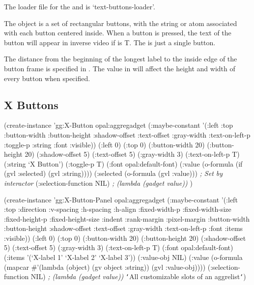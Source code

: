 \vspace{1 line}
The loader file for the  and
 is `text-buttons-loader'.

The  object is a set of rectangular buttons,
with the string or atom associated with each button centered inside.
When a button is pressed, the text of the button will appear in
inverse video if  is T.  The  is
just a single button.

The distance from the beginning of the longest label to the inside
edge of the button frame is specified in .  The value
in  will affect the height and width of every button
when specified.

\begin{group}
\subsection{X Buttons}
\label{x-buttons}
\begin{programexample}
(create-instance 'gg:X-Button opal:aggregadget
   (:maybe-constant '(:left :top :button-width :button-height
		      :shadow-offset :text-offset :gray-width
		      :text-on-left-p :toggle-p :string :font :visible))
   (:left 0)
   (:top 0)
   (:button-width 20)
   (:button-height 20)
   (:shadow-offset 5)
   (:text-offset 5)
   (:gray-width 3)
   (:text-on-left-p T)
   (:string `X Button')
   (:toggle-p T)
   (:font opal:default-font)
   (:value (o-formula (if (gvl :selected) (gvl :string))))
   (:selected (o-formula (gvl :value))) {\it ; Set by interactor}
   (:selection-function NIL)            {\it ; (lambda (gadget value))}
   )
\end{programexample}
\vspace{1 line}

\begin{programexample}
(create-instance 'gg:X-Button-Panel opal:aggregadget
   (:maybe-constant '(:left :top :direction :v-spacing :h-spacing :h-align
		      :fixed-width-p :fixed-width-size :fixed-height-p :fixed-height-size
                      :indent :rank-margin :pixel-margin :button-width :button-height
                      :shadow-offset :text-offset :gray-width :text-on-left-p
		      :font :items :visible))
   (:left 0)
   (:top 0)
   (:button-width 20)
   (:button-height 20)
   (:shadow-offset 5)
   (:text-offset 5)
   (:gray-width 3)
   (:text-on-left-p T)
   (:font opal:default-font)
   (:items '(`X-label 1' `X-label 2' `X-label 3'))
   (:value-obj NIL)
   (:value (o-formula (mapcar \#'(lambda (object)
				  (gv object :string))
			      (gvl :value-obj))))
   (:selection-function NIL)  {\it ; (lambda (gadget value))}
   {\tt\char`\<}All customizable slots of an aggrelist{\tt\char`\>})
\end{programexample}
\end{group}

